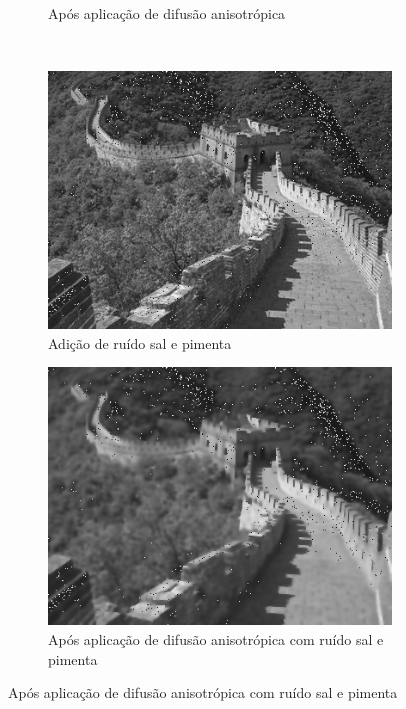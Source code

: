 \documentclass[10pt,a4paper]{article}
\begin{document}
\begin{figure}[!ht]
\begin{subfigure}[ht]{0.4\textwidth}
        \caption{\centering Após aplicação de difusão anisotrópica}
        \label{fig:china_aniso}
    \end{subfigure}
    \\
    \begin{subfigure}[ht]{0.4\textwidth}
        \includegraphics[width=\textwidth]{china_dst_sp.jpg}
        \caption{\centering Adição de ruído sal e pimenta}
        \label{fig:china_sp}
    \end{subfigure}
    \qquad
    \begin{subfigure}[ht]{0.4\textwidth}
        \includegraphics[width=\textwidth]{china_aniso_sp.jpg}
        \caption{\centering Após aplicação de difusão anisotrópica com ruído sal e pimenta}

\end{subfigure}
\end{figure}
\end{document}
